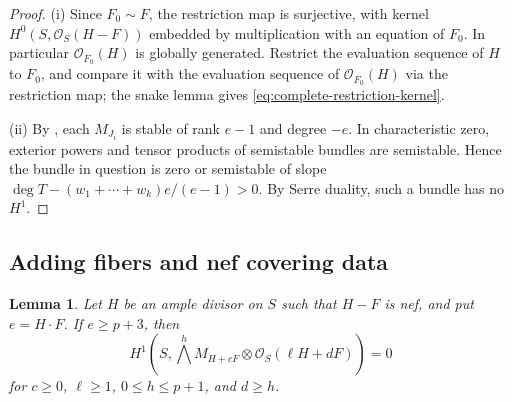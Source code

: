 \documentclass[11pt,reqno]{amsart}
\numberwithin{equation}{section}
\newtheorem{lemma}[lemma]{Lemma}
\theoremstyle{remark}
\newcommand{\sshf}[1]{\mathcal{O}_{#1}}
\begin{document}
\begin{proof}
(i) Since \(F_0\sim F\), the restriction map is surjective, with kernel \(H^0(S,\sshf{S}(H-F))\) embedded by multiplication with an equation of \(F_0\). In particular \(\sshf{F_0}(H)\) is globally generated. Restrict the evaluation sequence of \(H\) to \(F_0\), and compare it with the evaluation sequence of \(\sshf{F_0}(H)\) via the restriction map; the snake lemma gives \eqref{eq:complete-restriction-kernel}.

(ii) By \cite{Butler}, each \(M_{J_i}\) is stable of rank \(e-1\) and degree \(-e\). In characteristic zero, exterior powers and tensor products of semistable bundles are semistable. Hence the bundle in question is zero or semistable of slope \(\deg T-(w_1+\cdots+w_k)e/(e-1)>0\). By Serre duality, such a bundle has no \(H^1\).
\end{proof}

\subsection{Adding fibers and nef covering data}\label{sec:add-fibers}

\begin{lemma}\label{lem:add-anticanonical}
Let \(H\) be an ample divisor on \(S\) such that \(H-F\) is nef, and put \(e=H\cdot F\). If \(e\geq p+3\), then
\begin{equation}\label{eq:add-anticanonical}
 H^1\!\left(S,\bigwedge^hM_{H+cF}\otimes\sshf{S}(\ell H+dF)\right)=0
\end{equation}
for \(c\geq0\), \(\ell\geq1\), \(0\leq h\leq p+1\), and \(d\geq h\).
\end{lemma}
\end{document}
